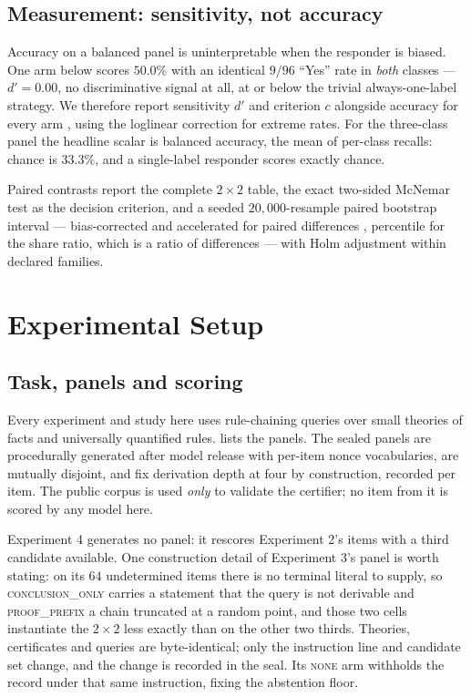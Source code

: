 \documentclass[10pt,twocolumn]{article}
\begin{document}
\subsection{Measurement: sensitivity, not accuracy}
\label{sec:measurement}

Accuracy on a balanced panel is uninterpretable when the responder is biased. One
arm below scores $50.0\%$ with an identical $9/96$ ``Yes'' rate in \emph{both}
classes --- $d' = 0.00$, no discriminative signal at all, at or below the trivial
always-one-label strategy. We therefore report sensitivity $d'$ and criterion $c$ alongside
accuracy for every arm \citep{macmillan1991detection,stanislaw1999calculation},
using the loglinear correction for extreme rates. For the three-class panel the headline scalar is balanced accuracy, the mean of
per-class recalls: chance is $33.3\%$, and a single-label responder scores exactly
chance.

Paired contrasts report the complete $2\times2$ table, the exact two-sided
McNemar test \citep{mcnemar1947note} as the decision criterion, and a seeded $20{,}000$-resample paired bootstrap interval --- bias-corrected and
accelerated for paired differences \citep{efron1987better}, percentile for the
share ratio, which is a ratio of differences --- with Holm adjustment within
declared families.

\section{Experimental Setup}

\subsection{Task, panels and scoring}

Every experiment and study here uses rule-chaining queries over small theories of
facts and universally quantified rules.  lists the panels. The sealed
panels are procedurally generated after model release with per-item nonce
vocabularies, are mutually disjoint, and fix derivation depth at four by
construction, recorded per item. The public corpus is used \emph{only} to
validate the certifier; no item from it is scored by any model here.

Experiment 4 generates no panel: it rescores Experiment 2's items with a third
candidate available. One construction detail of Experiment 3's panel is worth
stating: on its $64$ undetermined items there is no terminal literal to supply,
so \textsc{conclusion\_only} carries a statement that the query is not derivable
and \textsc{proof\_prefix} a chain truncated at a random point, and those two
cells instantiate the $2\times2$ less exactly than on the other two thirds. Theories, certificates and queries are
byte-identical; only the instruction line and candidate set change, and the
change is recorded in the seal. Its \textsc{none} arm withholds the record under that same instruction, fixing
the abstention floor.
\end{document}
